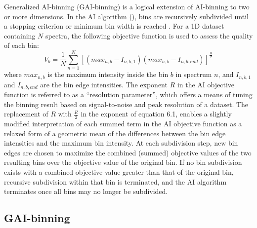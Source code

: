 \begin{doublespace}
Generalized AI-binning (GAI-binning) is a logical extension of AI-binning to
two or more dimensions. In the AI algorithm (), bins
are recursively subdivided until a stopping criterion or minimum bin width is
reached \cite{demeyer:anchem2008}. For a 1D dataset containing $N$ spectra,
the following objective function is used to assess the quality of each bin:
\begin{equation}
V_b = \frac{1}{N}
  \sum_{n=1}^N \left[
    (max_{n,b} - I_{n,b,1})
    (max_{n,b} - I_{n,b,end}) \right]^\frac{R}{2}
\end{equation}
where $max_{n,b}$ is the maximum intensity inside the bin $b$ in spectrum $n$,
and $I_{n,b,1}$ and $I_{n,b,end}$ are the bin edge intensities. The exponent
$R$ in the AI objective function is referred to as a ``resolution parameter'',
which offers a means of tuning the binning result based on signal-to-noise and
peak resolution of a dataset. The replacement of $R$ with $\frac{R}{2}$ in the
exponent of equation 6.1, enables a slightly modified interpretation of each
summed term in the AI objective function as a relaxed form of a geometric mean
of the differences between the bin edge intensities and the maximum bin
intensity. At each subdivision step, new bin edges are chosen to maximize the
combined (summed) objective values of the two resulting bins over the objective
value of the original bin. If no bin subdivision exists with a combined
objective value greater than that of the original bin, recursive subdivision
within that bin is terminated, and the AI algorithm terminates once all bins
may no longer be subdivided.
\end{doublespace}

\subsection{GAI-binning}

